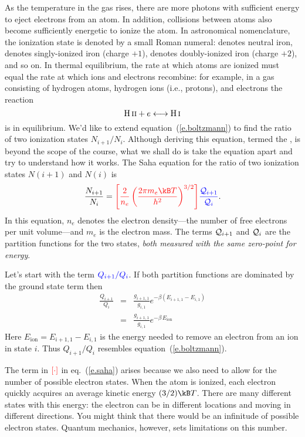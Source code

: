 As the temperature in the gas rises, there are more photons with sufficient energy to eject electrons from an atom. In addition, collisions between atoms also become sufficiently energetic to ionize the atom. In astronomical nomenclature, the ionization state is denoted by a small Roman numeral:  denotes neutral iron,  denotes singly-ionized iron (charge $+1$),  denotes doubly-ionized iron (charge $+2$), and so on. In thermal equilibrium, the rate at which atoms are ionized must equal the rate at which ions and electrons recombine: for example, in a gas consisting of hydrogen atoms, hydrogen ions (i.e., protons), and electrons the reaction
\[
	\mathrm{H}\,\textrm{\scshape ii} + e \longleftrightarrow \mathrm{H}\,\textrm{\scshape i}
\]
is in equilibrium. We'd like to extend equation~(\ref{e.boltzmann}) to find the ratio of two ionization states $N_{i+1}/N_{i}$. Although deriving this equation, termed the , is beyond the scope of the course, what we shall do is take the equation apart and try to understand how it works.  The Saha equation for the ratio of two ionization states $N(i+1)$ and $N(i)$ is
\begin{equation}\label{e.saha}
\frac{N_{i+1}}{N_{i}} 
= {\color{red}\left[\frac{2}{n_{e}}
\left(\frac{2\pi m_{e}\kB T}{h^{2}}\right)^{3/2}\right]}
{\color{blue}\frac{\pfcn_{i+1}}{\pfcn_{i}}}.
\end{equation}
In this equation, $n_{e}$ denotes the electron density---the number of free electrons per unit volume---and $m_{e}$ is the electron mass. The terms $\mathcal{Q}_{i+1}$ and $\mathcal{Q}_{i}$ are the partition functions for the two states, \emph{both measured with the same zero-point for energy}.

Let's start with the term $\color{blue} Q_{i+1}/Q_{i}$. If both partition functions are dominated by the ground state term then
\begin{eqnarray*}
	\frac{Q_{i+1}}{Q_{i}} &=& \frac{g_{i+1,1}}{g_{i,1}} e^{-\beta (E_{i+1,1}-E_{i,1})}\\
	&=& \frac{g_{i+1,1}}{g_{i,1}} e^{-\beta\,E_{\mathrm{ion}}}
\end{eqnarray*}
Here $E_{\mathrm{ion}} = E_{i+1,1} - E_{i,1}$ is the energy needed to remove an electron from an ion in state $i$. Thus $Q_{i+1}/Q_{i}$ resembles equation~(\ref{e.boltzmann}).

The term in $\color{red}\left[\cdot\right]$ in eq.~(\ref{e.saha}) arises because we also need to allow for the number of possible electron states. When the atom is ionized, each electron quickly acquires an average kinetic energy $(3/2)\kB T$. There are many different states with this energy: the electron can be in different locations and moving in different directions.  You might think that there would be an infinitude of possible electron states.  Quantum mechanics, however, sets limitations on this number.


